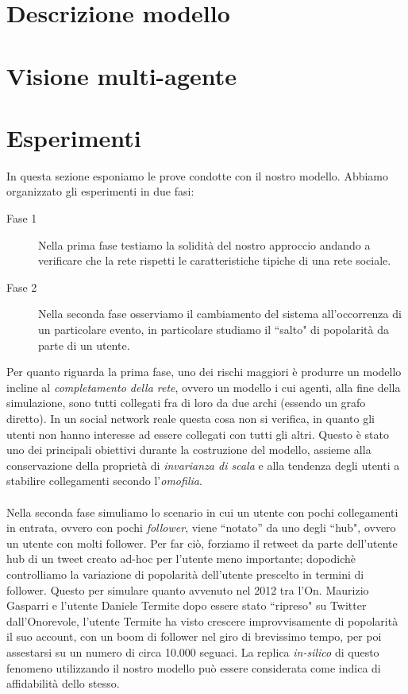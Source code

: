 \documentclass[a4paper,12pt]{article}
\begin{document}
\section{Descrizione modello} 
\label{sec:mod}
\section{Visione multi-agente}
\label{sec:mas}
\section{Esperimenti}
\label{sec:esp}
In questa sezione esponiamo le prove condotte con il nostro modello. 
Abbiamo organizzato gli esperimenti in due fasi: 
\begin{description}
\item[Fase 1] Nella prima fase testiamo la solidità del nostro approccio andando a verificare che la rete rispetti le caratteristiche tipiche di una rete sociale.
\item[Fase 2] Nella seconda fase osserviamo il cambiamento del sistema all'occorrenza di un particolare evento, in particolare studiamo il ``salto" di popolarità da parte di un utente.
\end{description}
Per quanto riguarda la prima fase, uno dei rischi maggiori è produrre un modello incline al \textit{completamento della rete}, ovvero un modello i cui agenti, alla fine della simulazione, sono tutti collegati fra di loro da due archi (essendo un grafo diretto). In un social network reale questa cosa non si verifica, in quanto gli utenti non hanno interesse ad essere collegati con tutti gli altri. Questo è stato uno dei principali obiettivi durante la costruzione del modello, assieme alla conservazione della proprietà di \textit{invarianza di scala} e alla tendenza degli utenti a stabilire collegamenti secondo l'\textit{omofilia}. 
\\
\\
Nella seconda fase simuliamo lo scenario in cui un utente con pochi collegamenti in entrata, ovvero con pochi \textit{follower}, viene ``notato'' da uno degli ``hub", ovvero un utente con molti follower. Per far ciò, forziamo il retweet da parte dell'utente hub di un tweet creato ad-hoc per l'utente meno importante; dopodichè controlliamo la variazione di popolarità  dell'utente prescelto in termini di follower. Questo per simulare quanto avvenuto nel 2012 tra l'On. Maurizio Gasparri e l'utente Daniele Termite \cite{termite} dopo essere stato ``ripreso" su Twitter dall'Onorevole, l'utente Termite ha visto crescere improvvisamente di popolarità il suo account, con un boom di follower nel giro di brevissimo tempo, per poi assestarsi su un numero di circa 10.000 seguaci. La replica \textit{in-silico} di questo fenomeno utilizzando il nostro modello può essere considerata come indica di affidabilità dello stesso.
\end{document}
